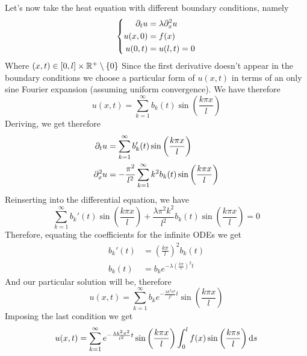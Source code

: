 \documentclass[../complete.tex]{subfiles}
\begin{document}
\begin{eg}
	Let's now take the heat equation with different boundary conditions, namely
	\begin{equation*}
		 \left\{\begin{aligned}
				 \partial_tu&=\lambda\partial^2_{x}u\\
				 u(x,0)&=f(x)\\
				 u(0,t)&=u(l,t)=0
		 \end{aligned}\right.
	\end{equation*}
	Where $(x,t)\in[0,l]\times\mathbb{R}^+\setminus\{0\}$
	Since the first derivative doesn't appear in the boundary conditions we choose a particular form of $u(x,t)$ in terms of an only sine Fourier expansion (assuming uniform convergence). We have therefore
	\begin{equation*}
		u(x,t)=\sum_{k=1}^{\infty}b_k(t)\sin\left( \frac{k\pi x}{l} \right)
	\end{equation*}
	Deriving, we get therefore
	\begin{equation*}
		\begin{aligned}
			\partial_tu&=\sum_{k=1}^{\infty}b_k'(t)\sin\left( \frac{k\pi x}{l} \right)\\
			\partial^2_xu&=-\frac{\pi^2}{l^2}\sum_{k=1}^{\infty}k^2b_k(t)\sin\left( \frac{k\pi x}{l} \right)
		\end{aligned}
	\end{equation*}
	Reinserting into the differential equation, we have
	\begin{equation*}
		\sum_{k=1}^{\infty}b_k'(t)\sin\left( \frac{k\pi x}{l} \right)+\frac{\lambda\pi^2k^2}{l^2}b_k(t)\sin\left( \frac{k\pi x}{l} \right)=0
	\end{equation*}
	Therefore, equating the coefficients for the infinite ODEs we get
	\begin{equation*}
		\begin{aligned}
			b_k'(t)&=\left( \frac{k\pi}{l} \right)^2b_k(t)\\
			b_k(t)&=b_ke^{-\lambda\left( \frac{k\pi}{l} \right)^2t}
		\end{aligned}
	\end{equation*}
	And our particular solution will be, therefore
	\begin{equation*}
		u(x,t)=\sum_{k=1}^{\infty}b_ke^{-\frac{\lambda k^2\pi^2}{l^2}t}\sin\left( \frac{k\pi x}{l} \right)
	\end{equation*}
	Imposing the last condition we get
	\begin{equation*}
		u(x,t)=\sum_{k=1}^{\infty}e^{-\frac{\lambda k^2\pi^2}{l^2}t}\sin\left( \frac{k\pi x}{l} \right)\int_{0}^{l}f(x)\sin\left( \frac{k\pi s}{l} \right)\operatorname{d\!} s
	\end{equation*}
\end{eg}
\end{document}
